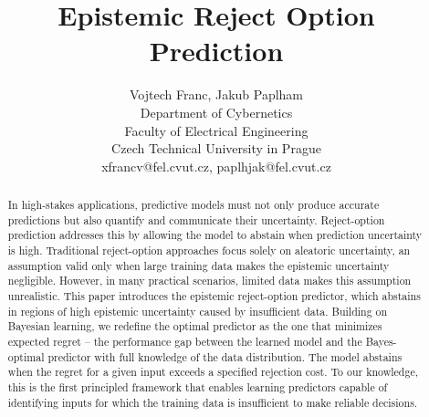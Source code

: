 \documentclass[twocolumn]{article} %
\title{Epistemic Reject Option Prediction}
\author {
    Vojtech Franc, 
    Jakub Paplham\\
    Department of Cybernetics\\
    Faculty of Electrical Engineering\\
    Czech Technical University in Prague\\
    xfrancv@fel.cvut.cz, paplhjak@fel.cvut.cz
}
\begin{document}
\maketitle

\begin{abstract}
In high-stakes applications, predictive models must not only produce accurate predictions but also quantify and communicate their uncertainty. Reject-option prediction addresses this by allowing the model to abstain when prediction uncertainty is high. Traditional reject-option approaches focus solely on aleatoric uncertainty, an assumption valid only when large training data makes the epistemic uncertainty negligible. However, in many practical scenarios, limited data makes this assumption unrealistic. This paper introduces the epistemic reject-option predictor, which abstains in regions of high epistemic uncertainty caused by insufficient data. Building on Bayesian learning, we redefine the optimal predictor as the one that minimizes expected regret -- the performance gap between the learned model and the Bayes-optimal predictor with full knowledge of the data distribution. The model abstains when the regret for a given input exceeds a specified rejection cost. To our knowledge, this is the first principled framework that enables learning predictors capable of identifying inputs for which the training data is insufficient to make reliable decisions.
\end{abstract}





%



%




\newpage

\end{document}
